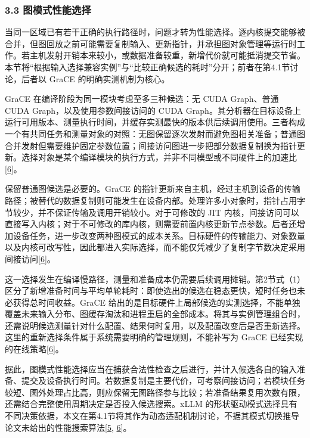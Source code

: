 \documentclass[UTF8,11pt,fontset=windows]{ctexart}
\begin{document}
\hypertarget{section-3-3}{%
\subsubsection{3.3 图模式性能选择}\label{section-3-3}}

当同一区域已有若干正确的执行路径时，问题才转为性能选择。逐内核提交能够被合并，但图回放之前可能需要复制输入、更新指针，并承担图对象管理等运行时工作。若主机发射开销本来较小，或数据准备较重，新增代价就可能抵消提交节省。本节将``根据输入选择兼容实例''与``比较正确候选的耗时''分开；前者在第4.1节讨论，后者以 GraCE 的明确实测机制为核心。

GraCE 在编译阶段为同一模块考虑至多三种候选：无 CUDA Graph、普通 CUDA Graph，以及使用参数间接访问的 CUDA Graph。其分析器在目标设备上运行可用版本、测量执行时间，并缓存实测最快的版本供后续调用使用。三者构成一个有共同任务和测量对象的对照：无图保留逐次发射而避免图相关准备；普通图合并发射但需要维护固定参数位置；间接访问图进一步把部分数据复制换为指针更新。选择对象是某个编译模块的执行方式，并非不同模型或不同硬件上的加速比\protect\hyperlink{ref-6}{{[}6{]}}。

保留普通图候选是必要的。GraCE 的指针更新来自主机，经过主机到设备的传输路径；被替代的数据复制则可能发生在设备内部。处理许多小对象时，指针占用字节较少，并不保证传输及调用开销较小。对于可修改的 JIT 内核，间接访问可以直接写入内核；对于不可修改的库内核，则需要前置内核更新节点参数。后者还增加设备任务，进一步改变两种图模式的成本关系。目标硬件的传输能力、对象数量以及内核可改写性，因此都进入实际选择，而不能仅凭减少了复制字节数决定采用间接访问\protect\hyperlink{ref-6}{{[}6{]}}。

这一选择发生在编译慢路径，测量和准备成本仍需要后续调用摊销。第2节式（1）区分了新增准备时间与平均单轮耗时：即使选出的候选在稳态更快，短时任务也未必获得总时间收益。GraCE 给出的是目标硬件上局部候选的实测选择，不能单独覆盖未来输入分布、图缓存淘汰和进程重启的全部成本。将其与实例管理组合时，还需说明候选测量针对什么配置、结果何时复用，以及配置改变后是否重新选择。这里的重新选择条件属于系统需要明确的管理规则，不能补写为 GraCE 已经实现的在线策略\protect\hyperlink{ref-6}{{[}6{]}}。

据此，图模式性能选择应当在捕获合法性检查之后进行，并计入候选各自的输入准备、提交及设备执行时间。若数据复制是主要代价，可考察间接访问；若模块任务较短、图外处理占比高，则应保留无图路径参与比较；若准备结果复用次数有限，还需结合完整使用周期决定是否投入候选搜索。xLLM 的形状驱动模式选择具有不同决策依据，本文在第4.1节将其作为动态适配机制讨论，不据其模式切换推导论文未给出的性能搜索算法\protect\hyperlink{ref-5}{{[}5}, \protect\hyperlink{ref-6}{6{]}}。
\end{document}

